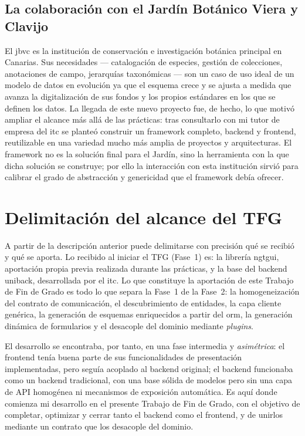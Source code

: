 \subsection{La colaboración con el Jardín Botánico Viera y Clavijo}
El \gls{jbvc} es la institución de conservación e investigación botánica principal
 en Canarias. Sus necesidades --- catalogación de especies, gestión
de colecciones, anotaciones de campo, jerarquías taxonómicas --- son un caso
de uso ideal de un modelo de datos en evolución ya que el esquema crece y se ajusta
a medida que avanza la digitalización de sus fondos y los propios estándares en los que se
definen los datos. La llegada de este nuevo proyecto fue, de hecho, lo que
motivó ampliar el alcance más allá de las prácticas: tras consultarlo con mi
tutor de empresa del \gls{itc} se planteó construir un \gls{framework} completo,
backend y frontend, reutilizable en una variedad mucho más amplia de proyectos
y arquitecturas. El framework no es la
solución final para el Jardín, sino la herramienta con la que dicha solución
se construye; por ello la interacción con esta institución sirvió para calibrar
el grado de abstracción y genericidad que el framework debía ofrecer.

\section{Delimitación del alcance del TFG}
A partir de la descripción anterior puede delimitarse con precisión qué se
recibió y qué se aporta. Lo recibido al iniciar el TFG (Fase~1) es: la librería
\gls{ngtgui}, aportación propia previa realizada durante las prácticas, y la
base del backend \gls{uniback}, desarrollada por el \gls{itc}. Lo que constituye
la aportación de este Trabajo de Fin de Grado es todo lo que separa la Fase~1
de la Fase~2: la homogeneización del contrato de comunicación, el descubrimiento
de entidades, la capa cliente genérica, la generación de esquemas enriquecidos
a partir del \gls{orm}, la generación dinámica de formularios y el desacople
del dominio mediante \emph{plugins}.

El desarrollo se encontraba, por tanto, en una fase intermedia y
\emph{asimétrica}: el frontend tenía buena parte de sus funcionalidades de
presentación implementadas, pero seguía acoplado al backend original; el
backend funcionaba como un backend tradicional, con una base sólida de modelos
pero sin una capa de API homogénea ni mecanismos de exposición automática. Es
aquí donde comienza mi desarrollo en el presente Trabajo de Fin de Grado, con
el objetivo de completar, optimizar y cerrar tanto el backend como el frontend,
y de unirlos mediante un contrato que los desacople del dominio.

